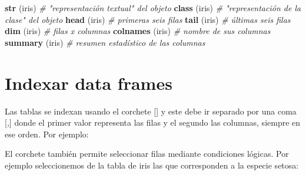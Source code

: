 \documentclass[
]{book}
\newenvironment{Shaded}{\begin{snugshade}}{\end{snugshade}}
\newcommand{\CommentTok}[1]{\textcolor[rgb]{0.56,0.35,0.01}{\textit{#1}}}
\newcommand{\DecValTok}[1]{\textcolor[rgb]{0.00,0.00,0.81}{#1}}
\newcommand{\KeywordTok}[1]{\textcolor[rgb]{0.13,0.29,0.53}{\textbf{#1}}}
\newcommand{\NormalTok}[1]{#1}
\newcommand{\OperatorTok}[1]{\textcolor[rgb]{0.81,0.36,0.00}{\textbf{#1}}}
\newcommand{\StringTok}[1]{\textcolor[rgb]{0.31,0.60,0.02}{#1}}
\begin{document}
\begin{Shaded}
\begin{Highlighting}[]
\KeywordTok{str}\NormalTok{ (iris)        }\CommentTok{# "representación textual" del objeto}
\KeywordTok{class}\NormalTok{ (iris)      }\CommentTok{# "representación de la clase" del objeto}
\KeywordTok{head}\NormalTok{ (iris)    }\CommentTok{# primeras seis filas}
\KeywordTok{tail}\NormalTok{ (iris)    }\CommentTok{# últimas seis filas}
\KeywordTok{dim}\NormalTok{ (iris)     }\CommentTok{# filas x columnas}
\KeywordTok{colnames}\NormalTok{ (iris)  }\CommentTok{# nombre de sus columnas}
\KeywordTok{summary}\NormalTok{ (iris)  }\CommentTok{# resumen estadístico de las columnas}
\end{Highlighting}
\end{Shaded}

\hypertarget{indexar-data-frames}{%
\section{Indexar data frames}\label{indexar-data-frames}}

Las tablas se indexan usando el corchete {[}{]} y este debe ir separado por una coma {[},{]} donde el primer valor representa las filas y el segundo las columnas, siempre en ese orden. Por ejemplo:

\begin{Shaded}
\end{Shaded}

El corchete también permite seleccionar filas mediante condiciones lógicas. Por ejemplo seleccionemos de la tabla de iris las que corresponden a la especie setosa:
\end{document}
